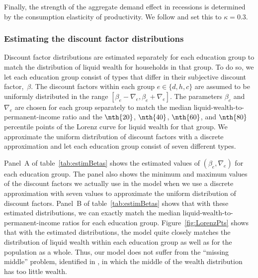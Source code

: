 \documentclass[\econtexRoot/HAFiscal]{subfiles}
\begin{document}
Finally, the strength of the aggregate demand effect in recessions is determined by the consumption elasticity of productivity.
We follow \cite{kmpHandbook2016} and set this to $\kappa=0.3$.



\hypertarget{estimating-the-discount-factor-distributions}{}\par\subsubsection{Estimating the discount factor distributions} 
\notinsubfile{\label{sec:estimBetas}}

Discount factor distributions are estimated separately for each education group to match the distribution of liquid wealth for households in that group.
To do so, we let each education group consist of types that differ in their subjective discount factor,~$\beta$.
The discount factors within each group $e\in \{d, h, c\}$ are assumed to be uniformly distributed in the range $[\beta_e-\nabla_e, \beta_e+\nabla_e]$.
The parameters $\beta_e$ and $\nabla_e$ are chosen for each group separately to match the median liquid-wealth-to-permanent-income ratio and the $\nth{20}$, $\nth{40}$, $\nth{60}$, and $\nth{80}$ percentile points of the Lorenz curve for liquid wealth for that group.
We approximate the uniform distribution of discount factors with a discrete approximation and let each education group consist of seven different types.

Panel~A of table~\ref{tab:estimBetas} shows the estimated values of $(\beta_e, \nabla_e)$ for each education group.
The panel also shows the minimum and maximum values of the discount factors we actually use in the model when we use a discrete approximation with seven values to approximate the uniform distribution of discount factors.
Panel~B of table~\ref{tab:estimBetas} shows that with these estimated distributions, we can exactly match the median liquid-wealth-to-permanent-income ratios for each education group.
Figure~\ref{fig:LorenzPts} shows that with the estimated distributions, the model quite closely matches the distribution of liquid wealth within each education group as well as for the population as a whole.
Thus, our model does not suffer from the ``missing middle'' problem, identified in \cite{kaplanMPC2022}, in which the middle of the wealth distribution has too little wealth.

\end{document}
